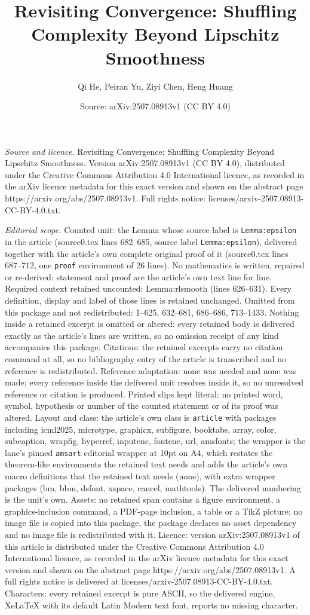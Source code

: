 \documentclass[10pt,a4paper]{amsart}
\title[Revisiting Convergence: Shuffling Complexity Beyond Lipschit]{Revisiting Convergence: Shuffling Complexity Beyond Lipschitz Smoothness}
\author{Qi He, Peiran Yu, Ziyi Chen, Heng Huang}
\date{Source: arXiv:2507.08913v1 (CC BY 4.0)}
\begin{document}
\maketitle

\noindent\emph{Source and licence.} Revisiting Convergence: Shuffling Complexity Beyond Lipschitz Smoothness. Version arXiv:2507.08913v1 (CC BY 4.0), distributed under the Creative Commons Attribution 4.0 International licence, as recorded in the arXiv licence metadata for this exact version and shown on the abstract page https://arxiv.org/abs/2507.08913v1. Full rights notice: licenses/arxiv-2507.08913-CC-BY-4.0.txt.\par\smallskip

\noindent\textit{Editorial scope.} Counted unit: the Lemma whose source label is \texttt{Lemma:epsilon} in the article (source0.tex lines 682--685, source label \texttt{Lemma:epsilon}), delivered together with the article's own complete original proof of it (source0.tex lines 687--712, one \texttt{proof} environment of 26 lines). No mathematics is written, repaired or re-derived: statement and proof are the article's own text line for line. Required context retained uncounted: Lemma:rlsmooth (lines 626--631). Every definition, display and label of those lines is retained unchanged. Omitted from this package and not redistributed: 1--625, 632--681, 686--686, 713--1433. Nothing inside a retained excerpt is omitted or altered: every retained body is delivered exactly as the article's lines are written, so no omission receipt of any kind accompanies this package. Citations: the retained excerpts carry no citation command at all, so no bibliography entry of the article is transcribed and no reference is redistributed. Reference adaptation: none was needed and none was made; every reference inside the delivered unit resolves inside it, so no unresolved reference or citation is produced. Printed slips kept literal: no printed word, symbol, hypothesis or number of the counted statement or of its proof was altered. Layout and class: the article's own class is \texttt{article} with packages including icml2025, microtype, graphicx, subfigure, booktabs, array, color, subcaption, wrapfig, hyperref, inputenc, fontenc, url, amsfonts; the wrapper is the lane's pinned \texttt{amsart} editorial wrapper at 10pt on A4, which restates the theorem-like environments the retained text needs and adds the article's own macro definitions that the retained text needs (none), with extra wrapper packages (bm, bbm, dsfont, xspace, cancel, mathtools). The delivered numbering is the unit's own. Assets: no retained span contains a figure environment, a graphics-inclusion command, a PDF-page inclusion, a table or a TikZ picture; no image file is copied into this package, the package declares no asset dependency and no image file is redistributed with it. Licence: version arXiv:2507.08913v1 of this article is distributed under the Creative Commons Attribution 4.0 International licence, as recorded in the arXiv licence metadata for this exact version and shown on the abstract page https://arxiv.org/abs/2507.08913v1. A full rights notice is delivered at licenses/arxiv-2507.08913-CC-BY-4.0.txt. Characters: every retained excerpt is pure ASCII, so the delivered engine, XeLaTeX with its default Latin Modern text font, reports no missing character.
\end{document}
